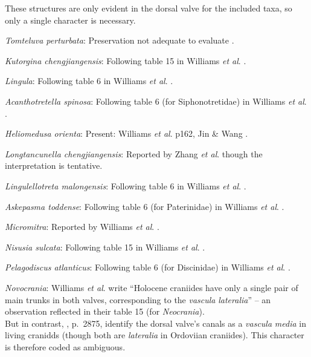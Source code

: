 \documentclass[openany]{book}
\theoremstyle{definition}
\theoremstyle{definition}
\theoremstyle{definition}
\theoremstyle{remark}
\begin{document}
These structures are only evident in the dorsal valve for the included
taxa, so only a single character is necessary.

\emph{Tomteluva perturbata}: Preservation not adequate to evaluate
\citep{Streng2016Anew}.

\emph{Kutorgina chengjiangensis}: Following table 15 in Williams
\emph{et al}. \citeyearpar{Williams2000BrachiopodaLinguliformea}.

\emph{Lingula}: Following table 6 in Williams \emph{et al}.
\citeyearpar{Williams2000BrachiopodaLinguliformea}.

\emph{Acanthotretella spinosa}: Following table 6 (for Siphonotretidae)
in Williams \emph{et al}.
\citeyearpar{Williams2000BrachiopodaLinguliformea}.

\emph{Heliomedusa orienta}: Present: Williams \emph{et al}.
\citeyearpar{Williams2000BrachiopodaLinguliformea} p162, Jin \& Wang
\citeyearpar{Jin1992Revisionof}.

\emph{Longtancunella chengjiangensis}: Reported by Zhang \emph{et al}.
\citeyearpar{Zhang2007Agregarious} though the interpretation is
tentative.

\emph{Lingulellotreta malongensis}: Following table 6 in Williams
\emph{et al}. \citeyearpar{Williams2000BrachiopodaLinguliformea}.

\emph{Askepasma toddense}: Following table 6 (for Paterinidae) in
Williams \emph{et al}.
\citeyearpar{Williams2000BrachiopodaLinguliformea}.

\emph{Micromitra}: Reported by Williams \emph{et al}.
\citeyearpar{Williams1998Thediversity}.

\emph{Nisusia sulcata}: Following table 15 in Williams \emph{et al}.
\citeyearpar{Williams2000BrachiopodaLinguliformea}.

\emph{Pelagodiscus atlanticus}: Following table 6 (for Discinidae) in
Williams \emph{et al}.
\citeyearpar{Williams2000BrachiopodaLinguliformea}.

\emph{Novocrania}: Williams \emph{et al}.
\citeyearpar{Williams2000BrachiopodaLinguliformea} write ``Holocene
craniides have only a single pair of main trunks in both valves,
corresponding to the \emph{vascula} \emph{lateralia}'' -- an observation
reflected in their table 15 (for \emph{Neocrania}).\\
But in contrast, \citet{Williams2007PartH}, p.~2875, identify the dorsal
valve's canals as a \emph{vascula} \emph{media} in living cranidds
(though both are \emph{lateralia} in Ordoviian craniides). This
character is therefore coded as ambiguous.
\end{document}
